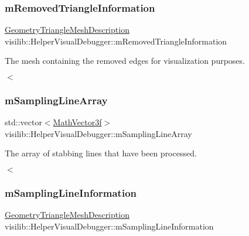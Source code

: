 \subsubsection{\texorpdfstring{mRemovedTriangleInformation}{mRemovedTriangleInformation}}
{\footnotesize\ttfamily \mbox{\hyperlink{structvisilib_1_1_geometry_triangle_mesh_description}{Geometry\+Triangle\+Mesh\+Description}} visilib\+::\+Helper\+Visual\+Debugger\+::m\+Removed\+Triangle\+Information\hspace{0.3cm}{\ttfamily [private]}}



The mesh containing the removed edges for visualization purposes. 

$<$ \mbox{\label{classvisilib_1_1_helper_visual_debugger_a9a39394f148771bb6aa197efceef971d}} 
\subsubsection{\texorpdfstring{mSamplingLineArray}{mSamplingLineArray}}
{\footnotesize\ttfamily std\+::vector$<$\mbox{\hyperlink{classvisilib_1_1_math_vector3__}{Math\+Vector3f}}$>$ visilib\+::\+Helper\+Visual\+Debugger\+::m\+Sampling\+Line\+Array\hspace{0.3cm}{\ttfamily [private]}}



The array of stabbing lines that have been processed. 

$<$ \mbox{\label{classvisilib_1_1_helper_visual_debugger_ad4d6c94e916f2cceb8fb0534dad8b07f}} 
\subsubsection{\texorpdfstring{mSamplingLineInformation}{mSamplingLineInformation}}
{\footnotesize\ttfamily \mbox{\hyperlink{structvisilib_1_1_geometry_triangle_mesh_description}{Geometry\+Triangle\+Mesh\+Description}} visilib\+::\+Helper\+Visual\+Debugger\+::m\+Sampling\+Line\+Information\hspace{0.3cm}{\ttfamily [private]}}



